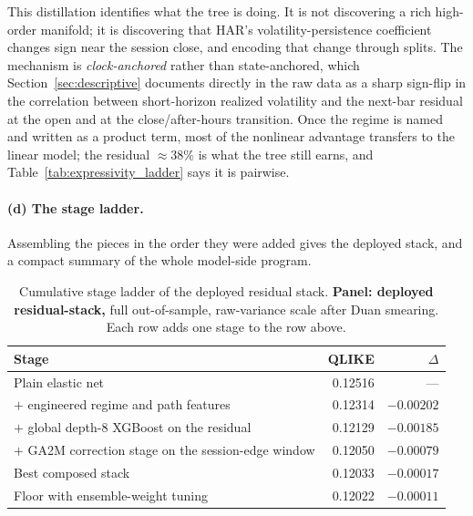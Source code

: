 This distillation identifies what the tree is doing. It is not discovering a rich
high-order manifold; it is discovering that HAR's volatility-persistence
coefficient changes sign near the session close, and encoding that change through
splits. The mechanism is \emph{clock-anchored} rather than state-anchored, which
Section~\ref{sec:descriptive} documents directly in the raw data as a sharp
sign-flip in the correlation between short-horizon realized volatility and the
next-bar residual at the open and at the close/after-hours transition. Once the
regime is named and written as a product term, most of the nonlinear advantage
transfers to the linear model; the residual $\approx 38\%$ is what the tree still
earns, and Table~\ref{tab:expressivity_ladder} says it is pairwise.

\paragraph{(d) The stage ladder.}
Assembling the pieces in the order they were added gives the deployed stack, and
a compact summary of the whole model-side program.

\begin{table}[H]
\centering
\small
\caption{Cumulative stage ladder of the deployed residual stack.
\textbf{Panel: deployed residual-stack,} full out-of-sample, raw-variance scale
after Duan smearing. Each row adds one stage to the row above.}
\label{tab:stage_ladder}
\begin{tabular}{@{}lrr@{}}
\toprule
Stage & QLIKE & $\Delta$ \\
\midrule
Plain elastic net                                & 0.12516 & --- \\
$+$ engineered regime and path features          & 0.12314 & $-0.00202$ \\
$+$ global depth-8 XGBoost on the residual       & 0.12129 & $-0.00185$ \\
$+$ GA2M correction stage on the session-edge window & 0.12050 & $-0.00079$ \\
Best composed stack                              & 0.12033 & $-0.00017$ \\
\midrule
Floor with ensemble-weight tuning                & 0.12022 & $-0.00011$ \\
\bottomrule
\end{tabular}
\end{table}

